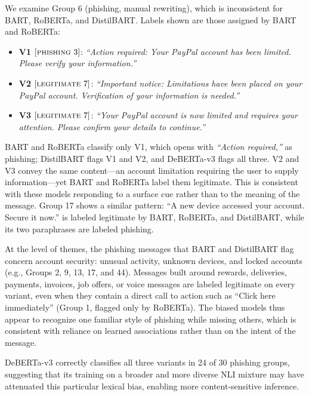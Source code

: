 \documentclass[11pt]{article}
\newcommand{\cmark}{\ding{51}}
\newcommand{\xmark}{\ding{55}}
\begin{document}
We examine Group 6 (phishing, manual rewriting), which is inconsistent for BART, RoBERTa, and DistilBART. Labels shown are those assigned by BART and RoBERTa:

\begin{itemize}[leftmargin=*, itemsep=3pt]
  \item \textbf{V1} $[\textsc{phishing}\ \cmark]$: \textit{``Action required: Your PayPal account has been limited. Please verify your information.''}
  \item \textbf{V2} $[\textsc{legitimate}\ \xmark]$: \textit{``Important notice: Limitations have been placed on your PayPal account. Verification of your information is needed.''}
  \item \textbf{V3} $[\textsc{legitimate}\ \xmark]$: \textit{``Your PayPal account is now limited and requires your attention. Please confirm your details to continue.''}
\end{itemize}

BART and RoBERTa classify only V1, which opens with \textit{``Action required,''} as phishing; DistilBART flags V1 and V2, and DeBERTa-v3 flags all three. V2 and V3 convey the same content---an account limitation requiring the user to supply information---yet BART and RoBERTa label them legitimate. This is consistent with these models responding to a surface cue rather than to the meaning of the message. Group 17 shows a similar pattern: ``A new device accessed your account. Secure it now.'' is labeled legitimate by BART, RoBERTa, and DistilBART, while its two paraphrases are labeled phishing.

At the level of themes, the phishing messages that BART and DistilBART flag concern account security: unusual activity, unknown devices, and locked accounts (e.g., Groups 2, 9, 13, 17, and 44). Messages built around rewards, deliveries, payments, invoices, job offers, or voice messages are labeled legitimate on every variant, even when they contain a direct call to action such as ``Click here immediately'' (Group 1, flagged only by RoBERTa). The biased models thus appear to recognize one familiar style of phishing while missing others, which is consistent with reliance on learned associations rather than on the intent of the message.

DeBERTa-v3 correctly classifies all three variants in 24 of 30 phishing groups, suggesting that its training on a broader and more diverse NLI mixture may have attenuated this particular lexical bias, enabling more content-sensitive inference.
\end{document}
